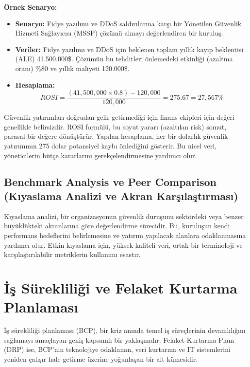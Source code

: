 \textbf{Örnek Senaryo:}
\begin{itemize}
    \item \textbf{Senaryo:} Fidye yazılımı ve DDoS saldırılarına karşı bir Yönetilen Güvenlik Hizmeti Sağlayıcısı (MSSP) çözümü almayı değerlendiren bir kuruluş.
    \item \textbf{Veriler:} Fidye yazılımı ve DDoS için beklenen toplam yıllık kayıp beklentisi (ALE) 41.500.000\$. Çözümün bu tehditleri önlemedeki etkinliği (azaltma oranı) \%80 ve yıllık maliyeti 120.000\$.
    \item \textbf{Hesaplama:}
    \begin{equation*}
    ROSI = \frac{(41,500,000 \times 0.8) - 120,000}{120,000} = 275.67 = 27,567\%
    \end{equation*}
\end{itemize}

Güvenlik yatırımları doğrudan gelir getirmediği için finans ekipleri için değeri genellikle belirsizdir. ROSI formülü, bu soyut yararı (azaltılan risk) somut, parasal bir değere dönüştürür. Yapılan hesaplama, her bir dolarlık güvenlik yatırımının 275 dolar potansiyel kaybı önlediğini gösterir. Bu nicel veri, yöneticilerin bütçe kararlarını gerekçelendirmesine yardımcı olur.

\subsection{Benchmark Analysis ve Peer Comparison (Kıyaslama Analizi ve Akran Karşılaştırması)}

Kıyaslama analizi, bir organizasyonun güvenlik duruşunu sektördeki veya benzer büyüklükteki akranlarına göre değerlendirme sürecidir. Bu, kuruluşun kendi performans hedeflerini belirlemesine ve yatırım yapılacak alanlara odaklanmasına yardımcı olur. Etkin kıyaslama için, yüksek kaliteli veri, ortak bir terminoloji ve karşılaştırılabilir metriklerin kullanımı esastır.

\section{İş Sürekliliği ve Felaket Kurtarma Planlaması}

İş sürekliliği planlaması (BCP), bir kriz anında temel iş süreçlerinin devamlılığını sağlamayı amaçlayan geniş kapsamlı bir yaklaşımdır. Felaket Kurtarma Planı (DRP) ise, BCP'nin teknolojiye odaklanan, veri kurtarma ve IT sistemlerini yeniden çalışır hale getirme üzerine yoğunlaşan bir alt kümesidir.

